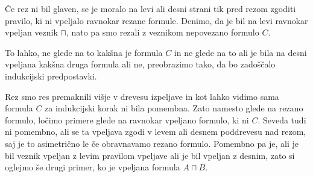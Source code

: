 Če rez ni bil glaven, se je moralo na levi ali desni strani tik pred rezom zgoditi pravilo, ki ni vpeljalo ravnokar rezane formule. Denimo, da je bil na levi ravnokar vpeljan veznik $\sqcap$, nato pa smo rezali z veznikom nepovezano formulo $C$.
\begin{prooftree}

\end{prooftree}
To lahko, ne glede na to kakšna je formula $C$ in ne glede na to ali je bila na desni vpeljana kakšna druga formula ali ne, preobrazimo tako, da bo zadoščalo indukcijski predpostavki.
\begin{prooftree}
\end{prooftree}
Rez smo res premaknili višje v drevesu izpeljave in kot lahko vidimo sama formula $C$ za indukcijski korak ni bila pomembna. Zato namesto glede na rezano formulo, ločimo primere glede na ravnokar vpeljano formulo, ki ni $C$. Seveda tudi ni pomembno, ali se ta vpeljava zgodi v levem ali desnem poddrevesu nad rezom, saj je to asimetrično le če obravnavamo rezano formulo. Pomembno pa je, ali je bil veznik vpeljan z levim pravilom vpeljave ali je bil vpeljan z desnim, zato si oglejmo še drugi primer, ko je vpeljana formula $A \sqcap B$.
\begin{prooftree}

\end{prooftree}
\dol
\begin{prooftree}


\end{prooftree}
